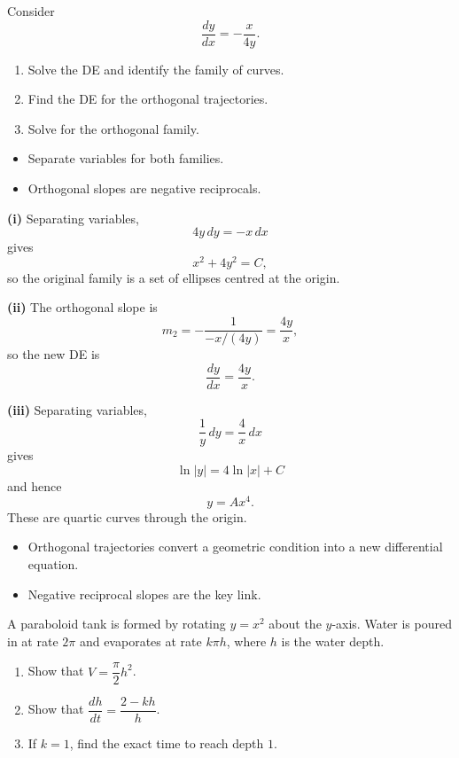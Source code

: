 \begin{problem}
Consider
\[
\frac{dy}{dx}=-\frac{x}{4y}.
\]
\begin{enumerate}
    \item[\textbf{i}] Solve the DE and identify the family of curves.
    \item[\textbf{ii}] Find the DE for the orthogonal trajectories.
    \item[\textbf{iii}] Solve for the orthogonal family.
\end{enumerate}
\end{problem}

\begin{hint}
\begin{itemize}[leftmargin=*]
    \item Separate variables for both families.
    \item Orthogonal slopes are negative reciprocals.
\end{itemize}
\end{hint}

\begin{solution}
\textbf{(i)} Separating variables,
\[
4y\,dy=-x\,dx
\]
gives
\[
x^2+4y^2=C,
\]
so the original family is a set of ellipses centred at the origin.

\textbf{(ii)} The orthogonal slope is
\[
m_2=-\frac{1}{-x/(4y)}=\frac{4y}{x},
\]
so the new DE is
\[
\frac{dy}{dx}=\frac{4y}{x}.
\]

\textbf{(iii)} Separating variables,
\[
\frac{1}{y}\,dy=\frac{4}{x}\,dx
\]
gives
\[
\ln|y|=4\ln|x|+C
\]
and hence
\[
\boxed{y=Ax^4}.
\]
These are quartic curves through the origin.
\end{solution}

\begin{takeaways}
\begin{itemize}[leftmargin=*]
    \item Orthogonal trajectories convert a geometric condition into a new differential equation.
    \item Negative reciprocal slopes are the key link.
\end{itemize}
\end{takeaways}

\begin{problem}
A paraboloid tank is formed by rotating $y=x^2$ about the $y$-axis. Water is poured in at rate $2\pi$ and evaporates at rate $k\pi h$, where $h$ is the water depth.
\begin{enumerate}
    \item[\textbf{i}] Show that $V=\dfrac{\pi}{2}h^2$.
    \item[\textbf{ii}] Show that $\dfrac{dh}{dt}=\dfrac{2-kh}{h}$.
    \item[\textbf{iii}] If $k=1$, find the exact time to reach depth $1$.
\end{enumerate}
\end{problem}

